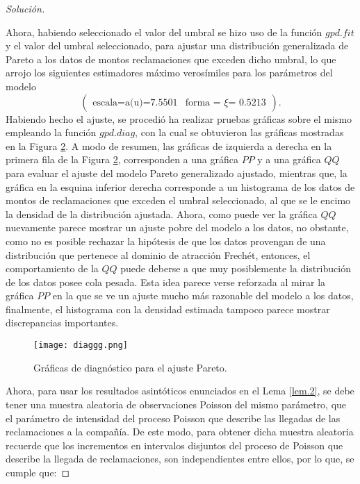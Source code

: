 \documentclass[10.5pt,notitlepage]{article}
\newenvironment{solucion}
  {\begin{proof}[Solución]}
  {\end{proof}}
\newcommand{\Matrix}[1]{\begin{pmatrix} #1 \end{pmatrix}}
\theoremstyle{plain}
\begin{document}
\begin{solucion}
\begin{figure}[htb]
    \label{fig:6}
\end{figure}
Ahora, habiendo seleccionado el valor del umbral se hizo uso de la función \(gpd.fit\) y el valor del umbral seleccionado, para ajustar una distribución generalizada de Pareto a los datos de montos reclamaciones que exceden dicho umbral, lo que arrojo los siguientes estimadores máximo verosímiles para los parámetros del modelo
\begin{equation}\label{params}
    \Matrix{\text{escala=a(u)=} 7.5501 & \text{forma = \(\xi\)= } 0.5213}.
\end{equation}
Habiendo hecho el ajuste, se procedió ha realizar pruebas gráficas sobre el mismo empleando la función \(gpd.diag\), con la cual se obtuvieron las gráficas mostradas en la Figura \ref{fig:7}. A modo de resumen, las gráficas de izquierda a derecha en la primera fila de la Figura \ref{fig:7}, corresponden a una gráfica \(PP\) y a una gráfica \(QQ\) para evaluar el ajuste del modelo Pareto generalizado ajustado, mientras que, la gráfica en la esquina inferior derecha corresponde a un histograma de los datos de montos de reclamaciones que exceden el umbral seleccionado, al que se le encimo la densidad de la distribución ajustada. Ahora, como puede ver la gráfica \(QQ\) nuevamente parece mostrar un ajuste pobre del modelo a los datos, no obstante, como no es posible rechazar la hipótesis de que los datos provengan de una distribución que pertenece al dominio de atracción Frechét, entonces, el comportamiento de la \(QQ\) puede deberse a que muy posiblemente la distribución de los datos posee cola pesada. Esta idea parece verse reforzada al mirar la gráfica \(PP\) en la que se ve un ajuste mucho más razonable del modelo a los datos, finalmente, el histograma con la densidad estimada tampoco parece mostrar discrepancias importantes.  
\begin{figure}[htb]
    \centering
    \texttt{[image: diaggg.png]}
    \caption{Gráficas de diagnóstico para el ajuste Pareto.}
    \label{fig:7}
\end{figure}
Ahora, para usar los resultados asintóticos enunciados en el Lema \eqref{lem.2}, se debe tener una muestra aleatoria de observaciones Poisson del mismo parámetro, que el parámetro de intensidad del proceso Poisson que describe las llegadas de las reclamaciones a la compañía. De este modo, para obtener dicha muestra aleatoria recuerde que los incrementos en intervalos disjuntos del proceso de Poisson que describe la llegada de reclamaciones, son independientes entre ellos, por lo que,  se cumple que: 

\end{solucion}
\end{document}
